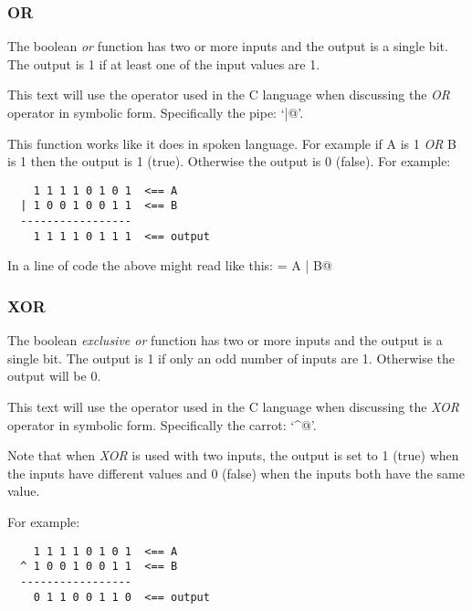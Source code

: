 \subsubsection{OR}

The boolean {\em or} function has two or more inputs and the output is a
single bit.  The output is 1 if at least one of the input values are 1.

This text will use the operator used in the C language when discussing
the {\em OR}  operator in symbolic form.  Specifically the pipe: `\verb@|@'.

This function works like it does in spoken language.  For example
if A is 1 {\em OR} B is 1 then the output is 1 (true).
Otherwise the output is 0 (false).  For example:

\begin{verbatim}
    1 1 1 1 0 1 0 1  <== A
  | 1 0 0 1 0 0 1 1  <== B
  -----------------
    1 1 1 1 0 1 1 1  <== output
\end{verbatim}

In a line of code the above might read like this: \verb@output = A | B@

\subsubsection{XOR}

The boolean {\em exclusive or} function has two or more inputs and the 
output is a single bit.  The output is 1 if only an odd number of inputs 
are 1. Otherwise the output will be 0.

This text will use the operator used in the C language when discussing
the {\em XOR}  operator in symbolic form.  Specifically the carrot: `\verb@^@'.

Note that when {\em XOR} is used with two inputs, the output
is set to 1 (true) when the inputs have different values and 0 
(false) when the inputs both have the same value.

For example:

\begin{verbatim}
    1 1 1 1 0 1 0 1  <== A
  ^ 1 0 0 1 0 0 1 1  <== B
  -----------------
    0 1 1 0 0 1 1 0  <== output
\end{verbatim}


